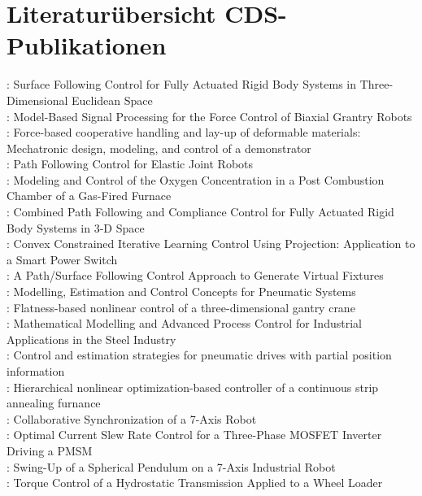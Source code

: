 \chapter{Literaturübersicht CDS-Publikationen}
\cite{AIT-140982} : Surface Following Control for Fully Actuated Rigid Body Systems in Three-Dimensional Euclidean Space
\\
\cite{AIT-142586} : Model-Based Signal Processing for the Force Control of Biaxial Grantry Robots
\\
\cite{AIT-142387} : Force-based cooperative handling and lay-up of deformable materials: Mechatronic design, modeling, and control of a demonstrator
\\
\cite{AIT-141890} : Path Following Control for Elastic Joint Robots
\\
\cite{AIT-141654} : Modeling and Control of the Oxygen Concentration in a Post Combustion Chamber of a Gas-Fired Furnace
\\
\cite{AIT-141651} : Combined Path Following and Compliance Control for Fully Actuated Rigid Body Systems in 3-D Space
\\
\cite{AIT-146558} : Convex Constrained Iterative Learning Control Using Projection: Application to a Smart Power Switch
\\
\cite{AIT-144111} : A Path/Surface Following Control Approach to Generate Virtual Fixtures
\\
\cite{AIT-144110} : Modelling, Estimation and Control Concepts for Pneumatic Systems
\\
\cite{AIT-144109} : Flatness-based nonlinear control of a three-dimensional gantry crane
\\
\cite{AIT-143622} : Mathematical Modelling and Advanced Process Control for Industrial Applications in the Steel Industry
\\
\cite{AIT-143052} : Control and estimation strategies for pneumatic drives with partial position information
\\
\cite{AIT-142969} : Hierarchical nonlinear optimization-based controller of a continuous strip annealing furnance
\\
\cite{AIT-146187} : Collaborative Synchronization of a 7-Axis Robot
\\
\cite{AIT-146186} : Optimal Current Slew Rate Control for a Three-Phase MOSFET Inverter Driving a PMSM
\\
\cite{AIT-146185} : Swing-Up of a Spherical Pendulum on a 7-Axis Industrial Robot
\\
\cite{AIT-146013} : Torque Control of a Hydrostatic Transmission Applied to a Wheel Loader

